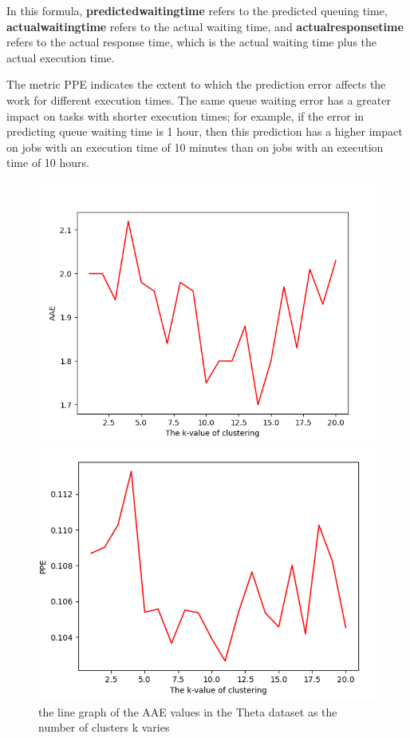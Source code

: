 \documentclass[conference,compsoc]{IEEEtran}
\begin{document}
In this formula, \textbf{predictedwaitingtime} refers to the predicted queuing time, \textbf{actualwaitingtime} refers to the actual waiting time, and \textbf{actualresponsetime} refers to the actual response time, which is the actual waiting time plus the actual execution time.

The metric PPE indicates the extent to which the prediction error affects the work for different execution times. The same queue waiting error has a greater impact on tasks with shorter execution times; for example, if the error in predicting queue waiting time is 1 hour, then this prediction has a higher impact on jobs with an execution time of 10 minutes than on jobs with an execution time of 10 hours. 


\begin{figure}[H]
	\begin{minipage}[t]{0.45\linewidth}
		\includegraphics[width=\linewidth]{AAEInTheta.png} 
		\caption{the line graph of the AAE values in the Theta dataset as the number of clusters k varies} 
		\label{Fig:AAEInTheta}
	\end{minipage}%
	\hfill%
	\begin{minipage}[t]{0.45\linewidth}
		\includegraphics[width=\linewidth]{PPEInTheta.png}

\end{minipage}
\end{figure}
\end{document}
